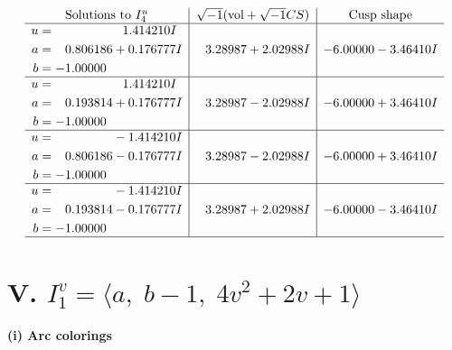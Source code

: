 \documentclass[1p]{elsarticle_modified}
\theoremstyle{definition}
\newcommand{\I}{\sqrt{-1}}
\begin{document}
$$\begin{array}{c|c|c}  
\text{Solutions to }I^u_{4}& \I (\text{vol} + \sqrt{-1}CS) & \text{Cusp shape}\\
 \hline 
\begin{aligned}
u &= \phantom{-0.000000 -}1.414210 I \\
a &= \phantom{-}0.806186 + 0.176777 I \\
b &= -1.00000\phantom{ +0.000000I}\end{aligned}
 & \phantom{-}3.28987 + 2.02988 I & -6.00000 - 3.46410 I \\ \hline\begin{aligned}
u &= \phantom{-0.000000 -}1.414210 I \\
a &= \phantom{-}0.193814 + 0.176777 I \\
b &= -1.00000\phantom{ +0.000000I}\end{aligned}
 & \phantom{-}3.28987 - 2.02988 I & -6.00000 + 3.46410 I \\ \hline\begin{aligned}
u &= \phantom{-0.000000 } -1.414210 I \\
a &= \phantom{-}0.806186 - 0.176777 I \\
b &= -1.00000\phantom{ +0.000000I}\end{aligned}
 & \phantom{-}3.28987 - 2.02988 I & -6.00000 + 3.46410 I \\ \hline\begin{aligned}
u &= \phantom{-0.000000 } -1.414210 I \\
a &= \phantom{-}0.193814 - 0.176777 I \\
b &= -1.00000\phantom{ +0.000000I}\end{aligned}
 & \phantom{-}3.28987 + 2.02988 I & -6.00000 - 3.46410 I\\
 \hline 
 \end{array}$$\newpage\newpage\renewcommand{\arraystretch}{1}
\centering \section*{V. $I^v_{1}= \langle a,\;b-1,\;4 v^2+2 v+1 \rangle$}
\flushleft \textbf{(i) Arc colorings}\\
\end{document}
